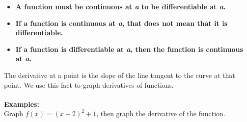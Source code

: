 \documentclass[addpoints, 12pt]{exam}
\begin{document}
\vfill

\begin{center}
    \begin{itemize}
        \item \textbf{A function must be continuous at \textit{a} to be differentiable at \textit{a}.}
        \item \textbf{If a function is continuous at \textit{a}, that does not mean that it is differentiable.}
        \item \textbf{If a function is differentiable at \textit{a}, then the function is continuous at \textit{a}.}
    \end{itemize}
\end{center}

\vfill

\newpage


The derivative at a point is the slope of the line tangent to the curve at that point. We use this fact to graph derivatives of functions.\\
\\
\noindent\textbf{Examples:}\\
Graph $\displaystyle f(x)=(x-2)^2+1$, then graph the derivative of the function.
\end{document}
